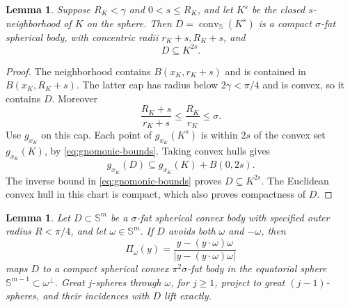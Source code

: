 \documentclass[11pt]{article}
\newtheorem{lemma}[theorem]{Lemma}
\theoremstyle{remark}
\newcommand{\Sph}{\mathbb S}
\newcommand{\conv}{\operatorname{conv}}
\begin{document}
\begin{lemma}
\label{lem:spherical-fattening}
Suppose \(R_K<\gamma\) and \(0<s\leq R_K\), and let \(K^s\) be the
closed \(s\)-neighborhood of \(K\) on the sphere.
Then \(D=\conv_{\Sph}(K^s)\) is a compact \(\sigma\)-fat spherical body,
with concentric radii \(r_K+s,R_K+s\), and
\[
 D\subseteq K^{2s}.
\]
\end{lemma}

\begin{proof}
The neighborhood contains \(B(x_K,r_K+s)\) and is contained in
\(B(x_K,R_K+s)\). The latter cap has radius below \(2\gamma<\pi/4\)
and is convex, so it contains \(D\). Moreover
\[
 \frac{R_K+s}{r_K+s}\leq\frac{R_K}{r_K}\leq\sigma.
\]
Use \(g_{x_K}\) on this cap. Each point of \(g_{x_K}(K^s)\) is within
\(2s\) of the convex set \(g_{x_K}(K)\), by
\eqref{eq:gnomonic-bounds}. Taking convex hulls gives
\[
 g_{x_K}(D)\subseteq g_{x_K}(K)+B(0,2s).
\]
The inverse bound in \eqref{eq:gnomonic-bounds} proves
\(D\subseteq K^{2s}\). The Euclidean convex hull in this chart is compact,
which also proves compactness of \(D\).
\end{proof}

\begin{lemma}
\label{lem:pole-projection}
Let \(D\subset\Sph^m\) be a \(\sigma\)-fat spherical convex body with
specified outer radius \(R<\pi/4\), and let \(\omega\in\Sph^m\).
If \(D\) avoids both \(\omega\) and \(-\omega\), then
\[
 \Pi_\omega(y)=
 \frac{y-(y\cdot\omega)\omega}
 {|y-(y\cdot\omega)\omega|}
\]
maps \(D\) to a compact spherical convex
\(\pi^2\sigma\)-fat body in the equatorial sphere
\(\Sph^{m-1}\subset\omega^\perp\).
Great \(j\)-spheres through \(\omega\), for \(j\geq1\), project to
great \((j-1)\)-spheres, and their incidences with \(D\) lift exactly.
\end{lemma}
\end{document}
